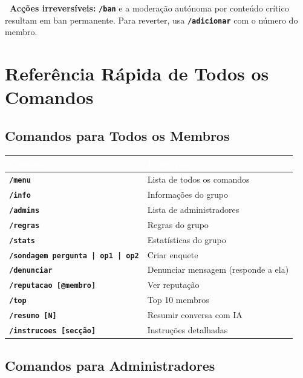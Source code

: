 \documentclass[12pt,a4paper]{article}
\newcommand{\cmd}[1]{\texttt{\textcolor{orbisblue}{\textbf{#1}}}}
\begin{document}
\begin{tcolorbox}[dangerbox]
\textbf{\textcolor{orbisRed}{\faBan\ Acções irreversíveis:}} \cmd{/ban} e a moderação autónoma por conteúdo crítico resultam em ban permanente. Para reverter, usa \cmd{/adicionar} com o número do membro.
\end{tcolorbox}

\section{Referência Rápida de Todos os Comandos}
\label{sec:referencia}

\subsection{Comandos para Todos os Membros}

\begin{center}
\begin{tabular}{L{5cm} L{8cm}}
\toprule
{}\textcolor{white}{\textbf{Comando}} & \textcolor{white}{\textbf{Descrição}} \\
\midrule
\cmd{/menu} & Lista de todos os comandos \\
\cmd{/info} & Informações do grupo \\
\cmd{/admins} & Lista de administradores \\
\cmd{/regras} & Regras do grupo \\
\cmd{/stats} & Estatísticas do grupo \\
\cmd{/sondagem pergunta | op1 | op2} & Criar enquete \\
\cmd{/denunciar} & Denunciar mensagem (responde a ela) \\
\cmd{/reputacao [@membro]} & Ver reputação \\
\cmd{/top} & Top 10 membros \\
\cmd{/resumo [N]} & Resumir conversa com IA \\
\cmd{/instrucoes [secção]} & Instruções detalhadas \\
\bottomrule
\end{tabular}
\end{center}

\subsection{Comandos para Administradores}
\end{document}
